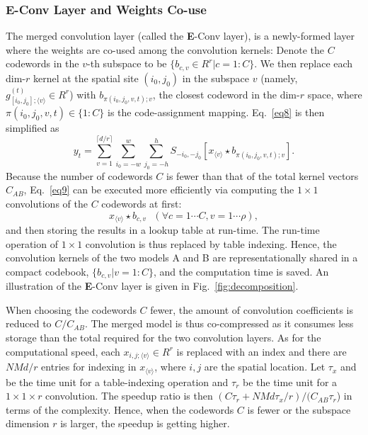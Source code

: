 \documentclass{article}
\begin{document}
	\subsubsection{E-Conv Layer and Weights Co-use}
	\label{sec:merge}
	The merged convolution layer (called the \textbf{E}-Conv layer), is a newly-formed layer where the weights are co-used among the convolution kernels:
	Denote the $C$ codewords in the $v$-th subspace to be $\{b_{c,v}\in R^r|c=1:C\}$.
	We then replace each dim-$r$ kernel at the spatial site $(i_0,j_0)$ in the subspace $v$ (namely, $g_{[i_0,j_0];\langle v \rangle}^{(t)}\in R^r$) with $b_{\pi(i_0,j_0,v,t);v}$, the closest codeword in the dim-$r$ space, where $\pi(i_0,j_0,v,t)\in\{1:C\}$ is the code-assignment mapping.
	Eq.~\ref{eq8} is then simplified as
	\begin{equation}
	\label{eq9}
	y_t =\sum_{v=1}^{\lceil d/r \rceil}\sum_{i_0=-w}^{w}\sum_{j_0=-h}^{h} S_{-i_0, -j_0}[x_{\langle v \rangle} \star b_{\pi(i_0,j_0,v,t);v}].
	\end{equation}
	Because the number of codewords $C$ is fewer than that of the total kernel vectors $C_{AB}$, Eq.~\ref{eq9} can be executed more efficiently via computing the $1\times1$ convolutions of the $C$ codewords at first:
	\begin{equation}
	\label{eq10}
	x_{\langle v \rangle} \star b_{c,v}~~~(\forall c=1 \cdots C, v=1 \cdots \rho),
	\end{equation}
	and then storing the results in a lookup table at run-time.
	The run-time operation of $1\times1$ convolution is thus replaced by table indexing.
	Hence, the convolution kernels of the two models A and B are representationally shared in a compact codebook, $\{b_{c,v}|v=1:C\}$, and the computation time is saved.
	An illustration of the \textbf{E}-Conv layer is given in Fig.~\ref{fig:decomposition}.
	
	
	When choosing the codewords $C$ fewer, the amount of convolution coefficients is reduced to $C/C_{AB}$.
	The merged model is thus co-compressed as it consumes less storage than the total required for the two convolution layers.
	As for the computational speed, each $x_{i,j;\langle v\rangle}\in R^r$ is replaced with an index and there are $NMd/r$ entries for indexing in $x_{\langle v \rangle}$, where $i,j$ are the spatial location.
	Let $\tau_x$ and be the time unit for a table-indexing operation and $\tau_r$ be the time unit for a $1\times 1\times r$ convolution.
	The speedup ratio is then $(C\tau_r+NMd\tau_x/r)/(C_{AB}\tau_r$) in terms of the complexity.
	Hence, when the codewords $C$ is fewer or the subspace dimension $r$ is larger, the speedup is getting higher.
	
\end{document}
